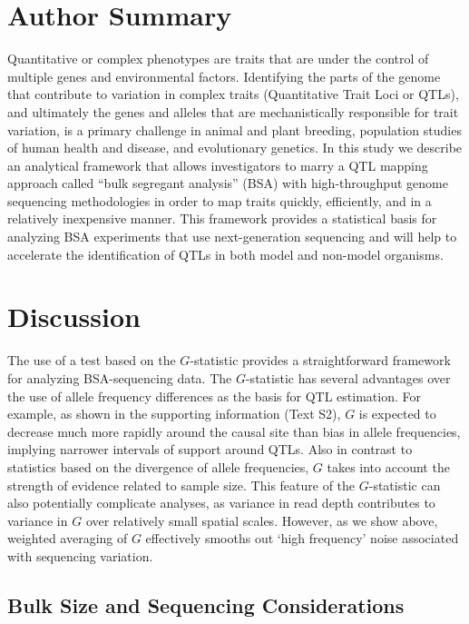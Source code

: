 \section{Author Summary}
Quantitative or complex phenotypes are traits that are under the control of multiple genes and environmental factors.  Identifying the parts of the genome that contribute to variation in complex traits (Quantitative Trait Loci or QTLs), and ultimately the genes and alleles that are mechanistically responsible for trait variation, is a primary challenge in animal and plant breeding, population studies of human health and disease, and evolutionary genetics. In this study we describe an analytical framework that allows investigators to marry a QTL mapping approach called ``bulk segregant analysis'' (BSA) with high-throughput genome sequencing methodologies in order to map traits quickly, efficiently, and in a relatively inexpensive manner. This framework provides a statistical basis for analyzing BSA experiments that use next-generation sequencing and will help to accelerate the identification of QTLs in both model and non-model organisms.

\section{Discussion}


The use of a test based on the $G$-statistic provides a straightforward  framework for analyzing BSA-sequencing data.  The $G$-statistic has several advantages over the use of allele frequency differences as the basis for QTL estimation. For example, as shown in the supporting information (Text S2), $G$ is expected to decrease much more rapidly around the causal site than bias in allele frequencies, implying narrower intervals of support around QTLs.  Also in contrast to statistics based on the divergence of allele frequencies, $G$ takes into account the strength of evidence related to sample size. This feature of the $G$-statistic can also potentially complicate analyses, as variance in read depth contributes to variance in $G$ over relatively small spatial scales. However, as we show above, weighted averaging of $G$ effectively smooths out `high frequency' noise associated with sequencing variation.


\subsection{Bulk Size and Sequencing Considerations}

